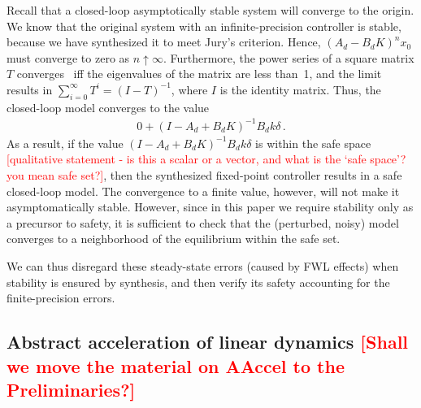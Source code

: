 \documentclass[twocolumn]{autart}    %
\renewcommand{\note}[1]{\textcolor{red}{[#1]}}
\begin{document}
\normalsize
Recall that a closed-loop asymptotically stable system will converge to the origin.  
We know that the original system with an infinite-precision controller is stable, 
because we have synthesized it to meet Jury's criterion.  
Hence, $(A_d - B_dK)^n x_0$  must converge to zero as $n \uparrow \infty$. 
Furthermore, the power series of a square matrix $T$ converges~\cite{horn1990matrix} iff the eigenvalues of the matrix are less
than~1, and the limit results in 
%
$\sum_{i=0}^{\infty}T^i  = (I - T)^{-1}$, 
%
where $I$ is the identity matrix. 
Thus, the closed-loop model converges to the value 
%
\begin{align*}
0 + (I - A_d + B_dK)^{-1}B_dk\delta \,. 
\end{align*}
%
As a result, if the value $(I - A_d + B_dK)^{-1}B_dk\delta$ is within the safe space \note{qualitative statement - is this a scalar or a vector, and what is the `safe space'? you mean safe set?}, 
then the synthesized fixed-point controller results in a safe
closed-loop model.  The convergence to a finite value, however, will not
make it asymptomatically stable.
However,
since in this paper we require stability only as a precursor to safety, it
is sufficient to check that the (perturbed, noisy) model converges to a
neighborhood of the equilibrium within the safe set.

We can thus disregard these steady-state errors (caused by
FWL effects) when stability is ensured by synthesis, and then verify its
safety accounting for the finite-precision errors.



\ifx\axelerator
\subsection{Abstract acceleration of linear dynamics \note{Shall we move the material on AAccel to the Preliminaries?}} 
\label{ssec:aa}
 
\end{document}
